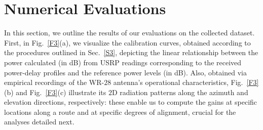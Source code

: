 \documentclass[10pt, twocolumn]{IEEEtran}
\begin{document}
\section{Numerical Evaluations}\label{S4}
In this section, we outline the results of our evaluations on the collected dataset. First, in Fig.~\ref{F3}(a), we visualize the calibration curves, obtained according to the procedures outlined in Sec.~\ref{S3}, depicting the linear relationship between the power calculated (in dB) from USRP readings corresponding to the received power-delay profiles and the reference power levels (in dB). Also, obtained via empirical recordings of the WR-$28$ antenna's operational characteristics, Fig.~\ref{F3}(b) and Fig.~\ref{F3}(c) illustrate its $2$D radiation patterns along the azimuth and elevation directions, respectively: these enable us to compute the gains at specific locations along a route and at specific degrees of alignment, crucial for the analyses detailed next.
\end{document}

